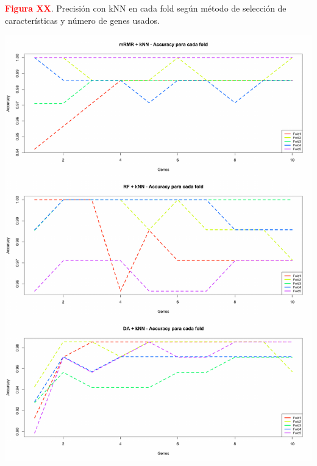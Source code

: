 \newpage
\textbf{\textcolor{red}{Figura XX}}. Precisión con kNN en cada fold según método de selección de características y número de genes usados.
\begin{center}
	\includegraphics[width=.95\textwidth]{figuras/higado_biclase_folds_acc_knn.pdf} \\
\end{center}

